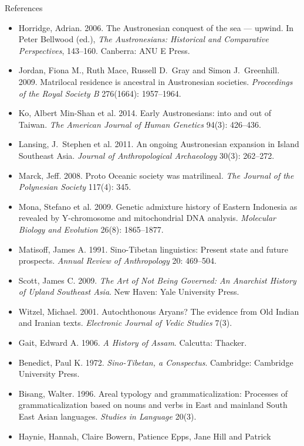 \documentclass{beamer}
\begin{document}
\begin{frame}[allowframebreaks]{References}
\begin{itemize}
{      Austronesians: Historical and Comparative Perspectives}, 161--173.
    Canberra: ANU E Press.
  \item Horridge, Adrian. 2006. The Austronesian conquest of the sea ---
    upwind. In Peter Bellwood (ed.), \textit{The Austronesians: Historical
      and Comparative Perspectives}, 143--160. Canberra: ANU E Press.
  \item Jordan, Fiona M., Ruth Mace, Russell D.\ Gray and Simon J.\ Greenhill.
    2009. Matrilocal residence is ancestral in Austronesian societies.
    \textit{Proceedings of the Royal Society B} 276(1664): 1957--1964.
  \item Ko, Albert Min-Shan et al. 2014. Early Austronesians: into and out of
    Taiwan. \textit{The American Journal of Human Genetics} 94(3): 426--436.
  \item Lansing, J.\ Stephen et al. 2011. An ongoing Austronesian expansion in
    Island Southeast Asia. \textit{Journal of Anthropological Archaeology}
    30(3): 262--272.
  \item Marck, Jeff. 2008. Proto Oceanic society was matrilineal.
    \textit{The Journal of the Polynesian Society} 117(4): 345.
  \item Mona, Stefano et al. 2009. Genetic admixture history of Eastern
    Indonesia as revealed by Y-chromosome and mitochondrial DNA analysis.
    \textit{Molecular Biology and Evolution} 26(8): 1865--1877.
  \item Matisoff, James A. 1991. Sino-Tibetan linguistics: Present state and
    future prospects. \textit{Annual Review of Anthropology} 20: 469--504.
  \item Scott, James C. 2009. \textit{The Art of Not Being Governed: An
    Anarchist History of Upland Southeast Asia}. New Haven: Yale University
    Press.
  \item Witzel, Michael. 2001. Autochthonous Aryans? The evidence from Old
    Indian and Iranian texts. \textit{Electronic Journal of Vedic Studies}
    7(3).
  \item Gait, Edward A. 1906. \textit{A History of Assam}. Calcutta: Thacker.
  \item Benedict, Paul K. 1972. \textit{Sino-Tibetan, a Conspectus}.
    Cambridge: Cambridge University Press.
  \item Bisang, Walter. 1996. Areal typology and grammaticalization: Processes
    of grammaticalization based on nouns and verbs in East and mainland South
    East Asian languages. \textit{Studies in Language} 20(3).
  \item Haynie, Hannah, Claire Bowern, Patience Epps, Jane Hill and Patrick

\end{itemize}
\end{frame}
\end{document}
